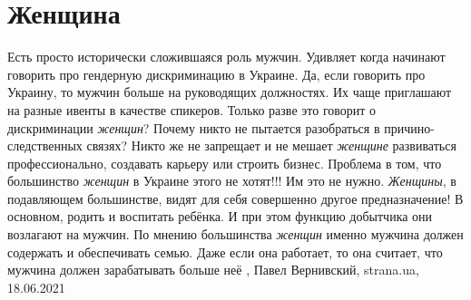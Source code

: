  
 
 
 
 
\chapter{Женщина}
\label{sec:slova.zhenschina}

Есть просто исторически сложившаяся роль мужчин.  Удивляет когда начинают
говорить про гендерную дискриминацию в Украине.  Да, если говорить про Украину,
то мужчин больше на руководящих должностях. Их чаще приглашают на разные ивенты
в качестве спикеров.  Только разве это говорит о дискриминации \emph{женщин}?
Почему никто не пытается разобраться в причино-следственных связях?  Никто же
не запрещает и не мешает \emph{женщине} развиваться профессионально, создавать
карьеру или строить бизнес.  Проблема в том, что большинство \emph{женщин} в
Украине этого не хотят!!! Им это не нужно. \emph{Женщины}, в подавляющем
большинстве, видят для себя совершенно другое предназначение! В основном,
родить и воспитать ребёнка.  И при этом функцию добытчика они возлагают на
мужчин. По мнению большинства \emph{женщин} именно мужчина должен содержать и
обеспечивать семью. Даже если она работает, то она считает, что мужчина должен
зарабатывать больше неё
, 
Павел Вернивский, strana.ua, 18.06.2021

